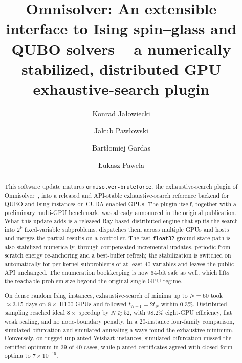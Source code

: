 \documentclass[12pt,a4paper]{elsarticle}
\begin{document}
\begin{frontmatter}

\title{Omnisolver: An extensible interface to Ising spin--glass and QUBO
solvers -- a numerically stabilized, distributed GPU exhaustive-search plugin}

\author[1]{Konrad Ja\l{}owiecki}
\author[2,3]{Jakub Paw{\l}owski}
\author[1,2]{Bart{\l}omiej Gardas}
\author[1,2]{{\L}ukasz Pawela}

\address[1]{Institute of Theoretical and Applied Informatics, Polish Academy
of Sciences, Ba{\l}tycka 5, 44-100 Gliwice, Poland}

\address[2]{Quantumz.io Sp. z o. o., Pu{\l}awska 12/3, 02-566 Warsaw, Poland}

\address[3]{Institute of Theoretical Physics, Faculty of Fundamental Problems
of Technology, Wroc{\l}aw University of Science and Technology,
50-370 Wroc{\l}aw, Poland}

\begin{abstract}
This software update matures \texttt{omnisolver-bruteforce}, the exhaustive-search
plugin of Omnisolver~\cite{jalowiecki2021omnisolver}, into a released and
API-stable exhaustive-search reference backend for QUBO and Ising
instances on CUDA-enabled GPUs. 
The plugin itself,
together with a preliminary multi-GPU benchmark, was already announced in the
original publication. What this update adds is a released Ray-based distributed
engine that splits the search into $2^{k}$ fixed-variable subproblems,
dispatches them across multiple GPUs and hosts and merges the partial results on
a controller. The fast \texttt{float32} ground-state path is also stabilized
numerically, through compensated incremental updates, periodic from-scratch
energy re-anchoring and a best-buffer refresh; the stabilization is switched on
automatically for per-kernel subproblems of at least $40$ variables and leaves
the public API unchanged. The enumeration bookkeeping is now 64-bit safe as
well, which lifts the reachable problem size beyond the original single-GPU
regime. 

On dense random Ising instances, exhaustive-search of minima up to \(N=60\) took
\(\approx 3.15\) days on \(8\times\) H100 GPUs and followed
\(t_{N+1}=2t_N\) within \(0.3\%\). Distributed sampling reached ideal
\(8\times\) speedup by \(N\gtrsim 52\), with \(98.2\%\) eight-GPU efficiency,
flat weak scaling, and no node-boundary penalty. In a 20-instance four-family
comparison, simulated bifurcation and simulated annealing always found the exhaustive
minimum. Conversely, on rugged unplanted Wishart instances, simulated
bifurcation missed the certified optimum in 39 of 40 cases, while planted
certificates agreed with closed-form optima to \(7\times10^{-15}\).


\end{abstract}
\end{frontmatter}
\end{document}

